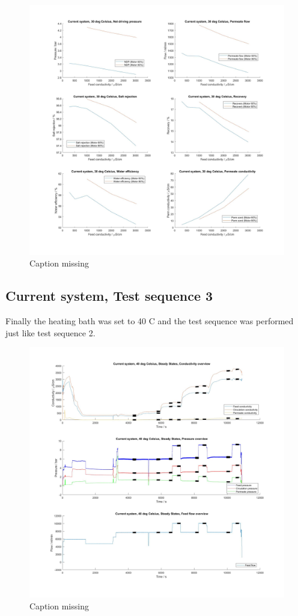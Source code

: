 \begin{figure}[H]
    \centering
    \includegraphics[width=1.1\textwidth]{Key30}
    \caption{Caption missing}
    \label{fig:PressConn}
\end{figure}

\newpage

\subsection{Current system, Test sequence 3}

Finally the heating bath was set to 40 C and the test sequence was performed just like test sequence 2. 

\begin{figure}[H]
    \centering
    \includegraphics[width=1.1\textwidth]{overview40}
    \caption{Caption missing}
    \label{fig:PressConn}
\end{figure}

